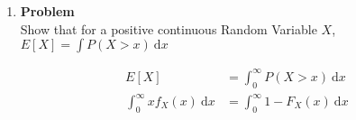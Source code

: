 \documentclass[12pt]{article}
\newenvironment{Ex}{\textbf{Problem}\vspace{.75em}\\}{}
\newcommand{\dd}[1]{\:\mathrm{d}{#1}}
\begin{document}
\begin{enumerate}
\begin{Ex}
\begin{solution}
\begin{enumerate}
\begin{multicols}{2}
\begin{equation}
\begin{aligned}
            \end{aligned}
          \end{equation}
        \end{multicols}
      \item $P(X<Y<2)$ can be represented as
        \begin{equation}
          \label{eq:6c-sol}
          \begin{aligned}
            P(X<Y<2) &= \int_0^2\int_0^yf_X(x)f_Y(y)\dd{x}\dd{y} \\
            &=\int_0^2\int_0^y6e^{-(2x+3y)}\dd{x}\dd{y} \\
            &= 3\int_0^2 e^{-3y} - e^{-5y} \dd{y} \\
            \implies P(X<Y<2) &= 0.3976
          \end{aligned}
        \end{equation}
      \item The equation is as follows
        \begin{equation}
          \label{eq:6d-sol}
          P(X\le Y^2) = \int_0^\infty\int_{0}^{y^2}
          f_X(x)f_Y(y)\dd{x}\dd{y}
        \end{equation}
      \item $E[X +Y]$ can be computed as follows
        \begin{equation}
          \label{eq:6e-sol}
          \begin{aligned}
            E[X +Y] &= E[X] + E[Y] \\
            &= \int_0^\infty x \cdot f_X(x) \dd{x} + \int_0^\infty y
            \cdot f_Y(y) \dd{y} \\
            \implies E[X +Y] &= \frac{5}{6}
          \end{aligned}
        \end{equation}
      \end{enumerate}
    \end{solution}
  \end{Ex}
\item
  \begin{Ex}
    Show that for a positive continuous Random Variable $X$, $E[X] =
    \int P(X > x) \dd{x}$
    \begin{solution} \hfill
      \begin{equation}
        \begin{aligned}
          \label{eq:7-sol}
          E[X] &= \int_{0}^{\infty} P(X > x) \dd{x} \\
          \int_{0}^{\infty} x f_X(x) \dd{x} &=
          \int_{0}^{\infty} 1 - F_X(x) \dd{x} \\

\end{aligned}
\end{equation}
\end{solution}
\end{Ex}
\end{enumerate}
\end{document}

